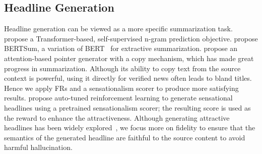 \subsection{Headline Generation} 
Headline generation can be viewed as a more specific summarization task.
\citet{qi2020prophetnet} propose a Transformer-based, self-supervised n-gram
prediction objective. 
\citet{liu2019finetune} propose BERTSum, a variation of
BERT~\cite{devlin-etal-2019-bert} for extractive summarization.
\citet{see-etal-2017-get} propose an attention-based pointer generator with a
copy mechanism, which has made great progress in summarization. 
Although its ability to copy text from the source context is powerful,
using it directly for verified news often leads to bland titles.
Hence we apply FRs and a sensationalism scorer to produce more satisfying results.
\citet{xu-etal-2019-clickbait} propose auto-tuned reinforcement learning
to generate sensational headlines using a pretrained sensationalism scorer;
the resulting score is used as the reward to enhance the attractiveness.
Although generating attractive headlines has been widely
explored~\cite{popularitybased, jin-etal-2020-hooks}, we focus more on
fidelity to ensure that the semantics of the generated headline are faithful to
the source content to avoid harmful hallucination.

